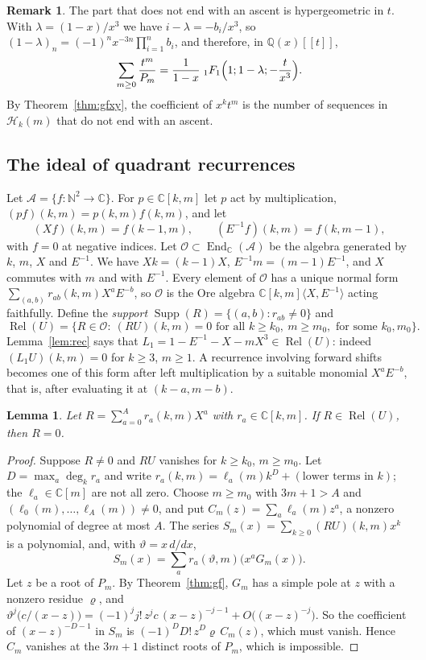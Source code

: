 \documentclass[11pt]{amsart}
\newtheorem{lemma}[theorem]{Lemma}
\theoremstyle{definition}
\newtheorem{remark}[theorem]{Remark}
\newcommand{\C}{\mathbb{C}}
\newcommand{\Q}{\mathbb{Q}}
\newcommand{\NN}{\mathbb{N}}
\newcommand{\cO}{\mathcal{O}}
\DeclareMathOperator{\Rel}{Rel}
\DeclareMathOperator{\Supp}{Supp}
\begin{document}
\begin{remark}\label{rem:1F1}
The part that does not end with an ascent is hypergeometric in $t$. With $\lambda=(1-x)/x^3$ we have $i-\lambda=-b_i/x^3$, so $(1-\lambda)_n=(-1)^nx^{-3n}\prod_{i=1}^{n}b_i$, and therefore, in $\Q(x)[[t]]$,
\[
  \sum_{m\ge0}\frac{t^m}{P_m}=\frac{1}{1-x}\;{}_1F_1\Bigl(1;1-\lambda;-\frac{t}{x^3}\Bigr).
\]
By Theorem~\ref{thm:gfxy}, the coefficient of $x^kt^m$ is the number of sequences in $\mathcal H_k(m)$ that do not end with an ascent.
\end{remark}

\subsection{The ideal of quadrant recurrences}
Let $\mathcal A=\{f:\NN^2\to\C\}$. For $p\in\C[k,m]$ let $p$ act by multiplication, $(pf)(k,m)=p(k,m)f(k,m)$, and let
\[
  (Xf)(k,m)=f(k-1,m),\qquad(E^{-1}f)(k,m)=f(k,m-1),
\]
with $f=0$ at negative indices. Let $\cO\subset\operatorname{End}_\C(\mathcal A)$ be the algebra generated by $k$, $m$, $X$ and $E^{-1}$. We have $Xk=(k-1)X$, $E^{-1}m=(m-1)E^{-1}$, and $X$ commutes with $m$ and with $E^{-1}$. Every element of $\cO$ has a unique normal form $\sum_{(a,b)}r_{ab}(k,m)X^aE^{-b}$, so $\cO$ is the Ore algebra $\C[k,m]\langle X,E^{-1}\rangle$ acting faithfully. Define the \emph{support} $\Supp(R)=\{(a,b):r_{ab}\ne0\}$ and
\[
  \Rel(U)=\{R\in\cO:\ (RU)(k,m)=0\text{ for all }k\ge k_0,\ m\ge m_0,\text{ for some }k_0,m_0\}.
\]
Lemma~\ref{lem:rec} says that $L_1=1-E^{-1}-X-mX^3\in\Rel(U)$: indeed $(L_1U)(k,m)=0$ for $k\ge3$, $m\ge1$. A recurrence involving forward shifts becomes one of this form after left multiplication by a suitable monomial $X^aE^{-b}$, that is, after evaluating it at $(k-a,m-b)$.

\begin{lemma}\label{lem:pure}
Let $R=\sum_{a=0}^{A}r_a(k,m)X^a$ with $r_a\in\C[k,m]$. If $R\in\Rel(U)$, then $R=0$.
\end{lemma}

\begin{proof}
Suppose $R\ne0$ and $RU$ vanishes for $k\ge k_0$, $m\ge m_0$. Let $D=\max_a\deg_kr_a$ and write $r_a(k,m)=\ell_a(m)k^D+(\text{lower terms in }k)$; the $\ell_a\in\C[m]$ are not all zero. Choose $m\ge m_0$ with $3m+1>A$ and $(\ell_0(m),\dots,\ell_A(m))\ne0$, and put $C_m(z)=\sum_a\ell_a(m)z^a$, a nonzero polynomial of degree at most $A$. The series $S_m(x)=\sum_{k\ge0}(RU)(k,m)x^k$ is a polynomial, and, with $\vartheta=x\,d/dx$,
\[
  S_m(x)=\sum_ar_a(\vartheta,m)\bigl(x^aG_m(x)\bigr).
\]
Let $z$ be a root of $P_m$. By Theorem~\ref{thm:gf}, $G_m$ has a simple pole at $z$ with a nonzero residue $\varrho$, and $\vartheta^j\bigl(c/(x-z)\bigr)=(-1)^jj!\,z^jc\,(x-z)^{-j-1}+O\bigl((x-z)^{-j}\bigr)$. So the coefficient of $(x-z)^{-D-1}$ in $S_m$ is $(-1)^DD!\,z^{D}\varrho\,C_m(z)$, which must vanish. Hence $C_m$ vanishes at the $3m+1$ distinct roots of $P_m$, which is impossible.
\end{proof}
\end{document}
